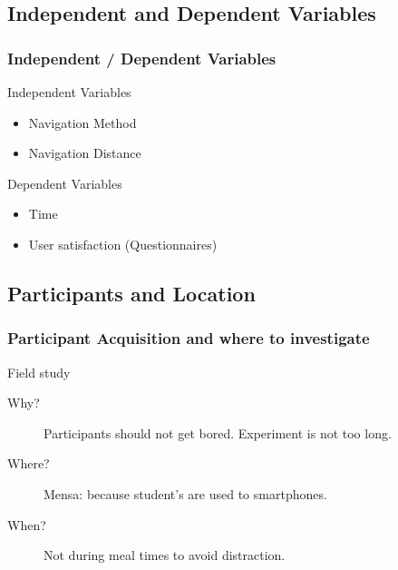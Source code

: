 \documentclass{beamer}
\begin{document}
\subsection{Independent and Dependent Variables}
\begin{frame}
        \frametitle{Independent / Dependent Variables}
        \begin{block}{Independent Variables}
                \begin{itemize}
                        \item Navigation Method
                        \item Navigation Distance
                \end{itemize}
        \end{block}
        \begin{block}{Dependent Variables}
                \begin{itemize}
                        \item Time 
                        \item User satisfaction (Questionnaires)
                \end{itemize}
        \end{block}
\end{frame}

\subsection{Participants and Location}
\begin{frame}
        \frametitle{Participant Acquisition and where to investigate}
        \begin{block}{Field study}
                \begin{description}
                        \item[Why?] Participants should not get bored.
                                Experiment is not too long.
                        \item[Where?] Mensa: because student's are used to smartphones.
                        \item[When?] Not during meal times to avoid distraction.
                \end{description}
        \end{block}
\end{frame}
\end{document}
